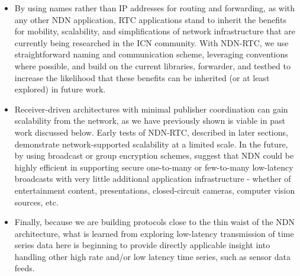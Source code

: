 \documentclass{icn/sig-alternate-2013} %
\newcommand{\ndnrtcName}{NDN-RTC} %
\begin{document}
\begin{itemize}
\item By using names rather than IP addresses for routing and forwarding, as with any other NDN application, RTC applications stand to inherit the benefits for mobility, scalability, and simplifications of network infrastructure that are currently being researched in the ICN community. With \ndnrtcName, we use  straightforward naming and communication scheme, leveraging conventions where possible, and build on the current libraries, forwarder, and  testbed to increase the likelihood that these benefits can be inherited (or at least explored) in future work. 
\item Receiver-driven architectures with minimal publisher coordination can gain scalability from the network, as we have previously shown is viable in past work discussed below. Early tests of \ndnrtcName, described in later sections,  demonstrate network-supported scalability at a limited scale. In the future,  by using broadcast or group encryption schemes, suggest that NDN could be highly efficient in supporting secure one-to-many or few-to-many low-latency broadcasts with very little additional application infrastructure - whether of entertainment content, presentations, closed-circuit cameras, computer vision sources, etc.  
\item Finally, because we are building protocols close to the thin waist of the NDN architecture, what is learned from exploring low-latency transmission of time series data here is beginning to provide directly applicable insight into handling other high rate  and/or low latency time series, such as sensor data feeds.  
\end{itemize}

\end{document}
